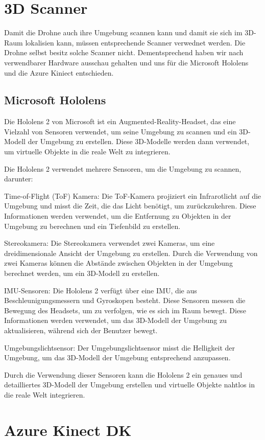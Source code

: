 \section{3D Scanner}
Damit die Drohne auch ihre Umgebung scannen kann und damit sie sich im 3D-Raum lokalisien kann, müssen entsprechende Scanner verwednet werden. Die Drohne selbst besitz solche Scanner nicht. Dementsprechend haben wir nach verwendbarer Hardware ausschau gehalten und uns für die Microsoft Hololens und die Azure Kiniect entschieden.

\subsection{Microsoft Hololens}
Die Hololens 2 von Microsoft ist ein Augmented-Reality-Headset, das eine Vielzahl von Sensoren verwendet, um seine Umgebung zu scannen und ein 3D-Modell der Umgebung zu erstellen. Diese 3D-Modelle werden dann verwendet, um virtuelle Objekte in die reale Welt zu integrieren.

Die Hololens 2 verwendet mehrere Sensoren, um die Umgebung zu scannen, darunter:

Time-of-Flight (ToF) Kamera: Die ToF-Kamera projiziert ein Infrarotlicht auf die Umgebung und misst die Zeit, die das Licht benötigt, um zurückzukehren. Diese Informationen werden verwendet, um die Entfernung zu Objekten in der Umgebung zu berechnen und ein Tiefenbild zu erstellen.

Stereokamera: Die Stereokamera verwendet zwei Kameras, um eine dreidimensionale Ansicht der Umgebung zu erstellen. Durch die Verwendung von zwei Kameras können die Abstände zwischen Objekten in der Umgebung berechnet werden, um ein 3D-Modell zu erstellen.

\ac{IMU}-Sensoren: Die Hololens 2 verfügt über eine \ac{IMU}, die aus Beschleunigungsmessern und Gyroskopen besteht. Diese Sensoren messen die Bewegung des Headsets, um zu verfolgen, wie es sich im Raum bewegt. Diese Informationen werden verwendet, um das 3D-Modell der Umgebung zu aktualisieren, während sich der Benutzer bewegt.

Umgebungslichtsensor: Der Umgebungslichtsensor misst die Helligkeit der Umgebung, um das 3D-Modell der Umgebung entsprechend anzupassen.

Durch die Verwendung dieser Sensoren kann die Hololens 2 ein genaues und detailliertes 3D-Modell der Umgebung erstellen und virtuelle Objekte nahtlos in die reale Welt integrieren.

\section{Azure Kinect DK}

